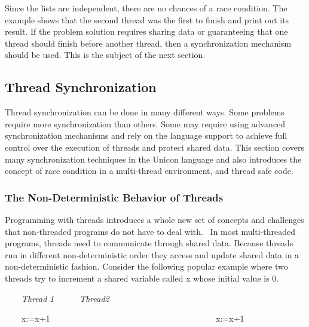 
Since the lists are independent, there are no chances of a race
condition. The example shows that the second thread was the first to
finish and print out its result. If the problem solution requires
sharing data or guaranteeing that one thread should finish before
another thread, then a synchronization mechanism should be used. This
is the subject of the next section.

\subsection[Thread Synchronization]{Thread Synchronization}

Thread synchronization can be done in many different ways. Some problems
require more synchronization than others. Some may require using
advanced synchronization mechanisms and rely on the language support to
achieve full control over the execution of threads and protect shared
data. This section covers many synchronization techniques in the Unicon
language and also introduces the concept of race condition in a
multi-thread environment, and thread safe code.

\subsubsection[The Non{}-Deterministic Behavior of Threads ]{The
Non-Deterministic Behavior of Threads }

Programming with threads introduces a whole new set of concepts and
challenges that non-threaded programs do not have to deal with. \ In
most multi-threaded programs, threads need to communicate through
shared data. Because threads run in different non-deterministic order
they access and update shared data in a non-deterministic fashion.
Consider the following popular example where two threads try to
increment a shared variable called \textsf{x} whose initial
value is \textsf{0}.

\ \ \ \ \textit{Thread}\textit{ }\textit{1\ \ \ \ \ \ Thread2}\textit{
}\textit{\ \ \ \ }

\ \ \ \ x:=x+1
\ \ \ \ \ \ \ \ \ \ \ \ \ \ \ \ \ \ \ \ \ \ \ \ \ \ \ \ \ \ \ \ \ \ \ \ \ \ \ x:=x+1
\ \ \ \ \ \ \ \ \ \ \ \ \ \ \ \ \ \ \ \ \ \ 

